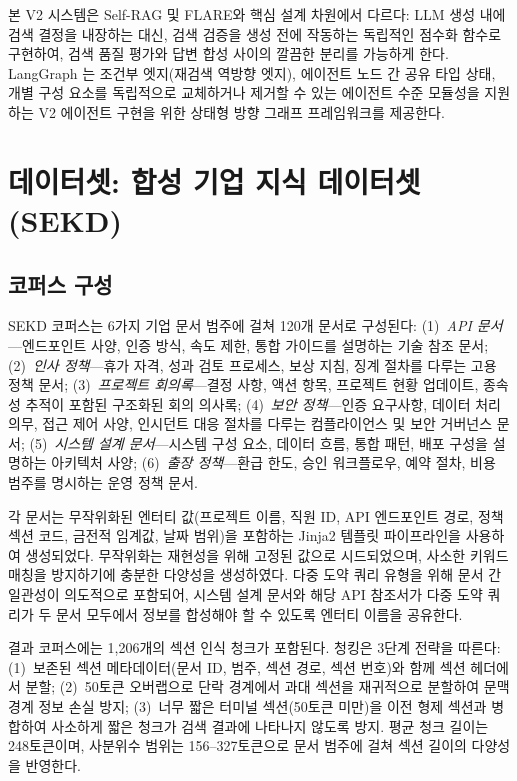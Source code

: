 \documentclass[11pt, a4paper]{article}
\begin{document}
본 V2 시스템은 Self-RAG 및 FLARE와 핵심 설계 차원에서 다르다: LLM 생성 내에 검색 결정을 내장하는 대신, 검색 검증을 생성 전에 작동하는 독립적인 점수화 함수로 구현하여, 검색 품질 평가와 답변 합성 사이의 깔끔한 분리를 가능하게 한다. LangGraph \citep{langgraph2024}는 조건부 엣지(재검색 역방향 엣지), 에이전트 노드 간 공유 타입 상태, 개별 구성 요소를 독립적으로 교체하거나 제거할 수 있는 에이전트 수준 모듈성을 지원하는 V2 에이전트 구현을 위한 상태형 방향 그래프 프레임워크를 제공한다.

\section{데이터셋: 합성 기업 지식 데이터셋(SEKD)}
\label{sec:dataset}

\subsection{코퍼스 구성}

SEKD 코퍼스는 6가지 기업 문서 범주에 걸쳐 120개 문서로 구성된다: (1)~\textit{API 문서}---엔드포인트 사양, 인증 방식, 속도 제한, 통합 가이드를 설명하는 기술 참조 문서; (2)~\textit{인사 정책}---휴가 자격, 성과 검토 프로세스, 보상 지침, 징계 절차를 다루는 고용 정책 문서; (3)~\textit{프로젝트 회의록}---결정 사항, 액션 항목, 프로젝트 현황 업데이트, 종속성 추적이 포함된 구조화된 회의 의사록; (4)~\textit{보안 정책}---인증 요구사항, 데이터 처리 의무, 접근 제어 사양, 인시던트 대응 절차를 다루는 컴플라이언스 및 보안 거버넌스 문서; (5)~\textit{시스템 설계 문서}---시스템 구성 요소, 데이터 흐름, 통합 패턴, 배포 구성을 설명하는 아키텍처 사양; (6)~\textit{출장 정책}---환급 한도, 승인 워크플로우, 예약 절차, 비용 범주를 명시하는 운영 정책 문서.

각 문서는 무작위화된 엔터티 값(프로젝트 이름, 직원 ID, API 엔드포인트 경로, 정책 섹션 코드, 금전적 임계값, 날짜 범위)을 포함하는 Jinja2 템플릿 파이프라인을 사용하여 생성되었다. 무작위화는 재현성을 위해 고정된 값으로 시드되었으며, 사소한 키워드 매칭을 방지하기에 충분한 다양성을 생성하였다. 다중 도약 쿼리 유형을 위해 문서 간 일관성이 의도적으로 포함되어, 시스템 설계 문서와 해당 API 참조서가 다중 도약 쿼리가 두 문서 모두에서 정보를 합성해야 할 수 있도록 엔터티 이름을 공유한다.

결과 코퍼스에는 1,206개의 섹션 인식 청크가 포함된다. 청킹은 3단계 전략을 따른다: (1)~보존된 섹션 메타데이터(문서 ID, 범주, 섹션 경로, 섹션 번호)와 함께 섹션 헤더에서 분할; (2)~50토큰 오버랩으로 단락 경계에서 과대 섹션을 재귀적으로 분할하여 문맥 경계 정보 손실 방지; (3)~너무 짧은 터미널 섹션(50토큰 미만)을 이전 형제 섹션과 병합하여 사소하게 짧은 청크가 검색 결과에 나타나지 않도록 방지. 평균 청크 길이는 248토큰이며, 사분위수 범위는 156--327토큰으로 문서 범주에 걸쳐 섹션 길이의 다양성을 반영한다.
\end{document}
